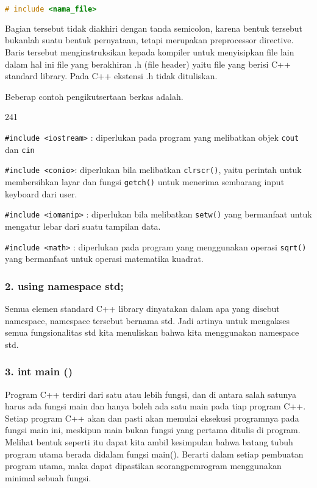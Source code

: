 \begin{lstlisting}[language=c++, numbers=none]
# include <nama_file>
\end{lstlisting}

Bagian tersebut tidak diakhiri dengan tanda semicolon, karena bentuk
tersebut bukanlah suatu bentuk pernyataan, tetapi merupakan preprocessor
directive. Baris tersebut menginstruksikan kepada kompiler untuk
menyisipkan file lain dalam hal ini file yang berakhiran .h (file
header) yaitu file yang berisi C++ standard library. Pada C++ ekstensi
.h tidak dituliskan.

Beberap contoh pengikutsertaan berkas adalah.

\begin{dinglist}{241}

\item
  \texttt{\#include\ \textless{}iostream\textgreater{}} : diperlukan
  pada program yang melibatkan objek \texttt{cout} dan \texttt{cin}
\item
  \texttt{\#include\ \textless{}conio\textgreater{}}: diperlukan bila
  melibatkan \texttt{clrscr()}, yaitu perintah untuk membersihkan layar
  dan fungsi \texttt{getch()} untuk menerima sembarang input keyboard
  dari user.
\item
  \texttt{\#include\ \textless{}iomanip\textgreater{}} : diperlukan bila
  melibatkan \texttt{setw()} yang bermanfaat untuk mengatur lebar dari
  suatu tampilan data.
\item
  \texttt{\#include\ \textless{}math\textgreater{}} : diperlukan pada
  program yang menggunakan operasi \texttt{sqrt()} yang bermanfaat untuk
  operasi matematika kuadrat.
\end{dinglist}

\subsubsection*{2. using namespace std;}\label{using-namespace-std}

Semua elemen standard C++ library dinyatakan dalam apa yang disebut
namespace, namespace tersebut bernama std. Jadi artinya untuk mengakses
semua fungsionalitas std kita menuliskan bahwa kita menggunakan
namespace std.

\subsubsection*{3. int main ()}\label{int-main}

Program C++ terdiri dari satu atau lebih fungsi, dan di antara salah
satunya harus ada fungsi main dan hanya boleh ada satu main pada tiap
program C++. Setiap program C++ akan dan pasti akan memulai eksekusi
programnya pada fungsi main ini, meskipun main bukan fungsi yang pertama
ditulis di program. Melihat bentuk seperti itu dapat kita ambil
kesimpulan bahwa batang tubuh program utama berada didalam fungsi
main(). Berarti dalam setiap pembuatan program utama, maka dapat
dipastikan seorangpemrogram menggunakan minimal sebuah fungsi.

